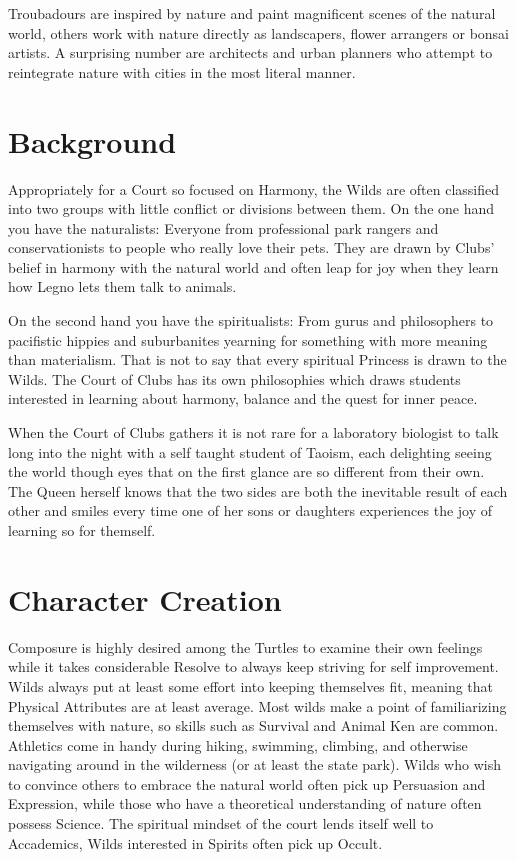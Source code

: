 Troubadours are inspired by nature and paint magnificent scenes of the natural world, others work with nature directly as landscapers, flower arrangers or bonsai artists. A surprising number are architects and urban planners who attempt to reintegrate nature with cities in the most literal manner.

\section*{Background}

Appropriately for a Court so focused on Harmony, the Wilds are often classified into two groups with little conflict or divisions between them. On the one hand you have the naturalists: Everyone from professional park rangers and conservationists to people who really love their pets. They are drawn by Clubs' belief in harmony with the natural world and often leap for joy when they learn how Legno lets them talk to animals. 

On the second hand you have the spiritualists: From gurus and philosophers to pacifistic hippies and suburbanites yearning for something with more meaning than materialism. That is not to say that every spiritual Princess is drawn to the Wilds. The Court of Clubs has its own philosophies which draws students interested in learning about harmony, balance and the quest for inner peace.

When the Court of Clubs gathers it is not rare for a laboratory biologist to talk long into the night with a self taught student of Taoism, each delighting seeing the world though eyes that on the first glance are so different from their own. The Queen herself knows that the two sides are both the inevitable result of each other and smiles every time one of her sons or daughters experiences the joy of learning so for themself. 


\section*{Character Creation}

Composure is highly desired among the Turtles to examine their own feelings while it takes considerable Resolve to always keep striving for self improvement. Wilds always put at least some effort into keeping themselves fit, meaning that Physical Attributes are at least average. Most wilds make a point of familiarizing themselves with nature, so skills such as Survival and Animal Ken are common. Athletics come in handy during hiking, swimming, climbing, and otherwise navigating around in the wilderness (or at least the state park). Wilds who wish to convince others to embrace the natural world often pick up Persuasion and Expression, while those who have a theoretical understanding of nature often possess Science. The spiritual mindset of the court lends itself well to Accademics, Wilds interested in Spirits often pick up Occult.

